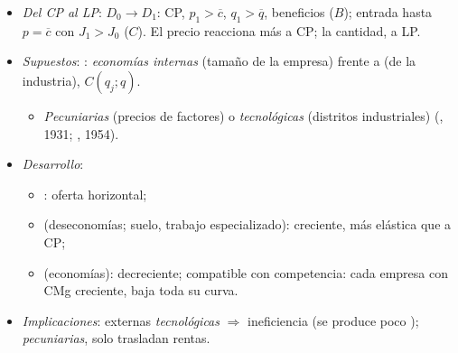 \documentclass{article}
\begin{document}
\begin{columnas}
\begin{itemize}
  \begin{itemize}
  \item \emph{beneficio económico nulo}: cubre el coste de oportunidad; la ganancia dura lo que tarda la entrada;
  \item \emph{eficiencia productiva}: escala mínima eficiente, nunca en el tramo de economías de escala;
  \item \emph{eficiencia asignativa}: 1TFEB sin convexidad.
  \end{itemize}
\item \emph{Del CP al LP}: $D_0\to D_1$: CP, $p_1>\overline{c}$, $q_1>\overline{q}$, beneficios ($B$); entrada hasta $p=\overline{c}$ con $J_1>J_0$ ($C$). El precio reacciona más a CP; la cantidad, a LP.
\end{itemize}
\begin{itemize}
\item \emph{Supuestos}: : \emph{economías internas} (tamaño de la empresa) frente a  (de la industria), $C(q_j;q)$.
  \begin{itemize}
  \item \emph{Pecuniarias} (precios de factores) o \emph{tecnológicas} (distritos industriales) (, 1931; , 1954).
  \end{itemize}
\item \emph{Desarrollo}:
  \begin{itemize}
  \item {}: oferta horizontal;
  \item {} (deseconomías; suelo, trabajo especializado): creciente, más elástica que a CP;
  \item {} (economías): decreciente; compatible con competencia: cada empresa con CMg creciente, baja toda su curva.
  \end{itemize}
\end{itemize}
\begin{itemize}
\item \emph{Implicaciones}: externas \emph{tecnológicas} $\Rightarrow$ ineficiencia (se produce poco ); \emph{pecuniarias}, solo trasladan rentas.
  \begin{itemize}

\end{itemize}
\end{itemize}
\end{columnas}
\end{document}
